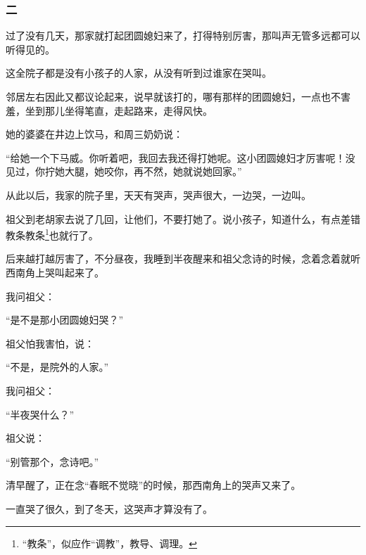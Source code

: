 \subsubsection*{二}
\par 过了没有几天，那家就打起团圆媳妇来了，打得特别厉害，那叫声无管多远都可以听得见的。
\par 这全院子都是没有小孩子的人家，从没有听到过谁家在哭叫。
\par 邻居左右因此又都议论起来，说早就该打的，哪有那样的团圆媳妇，一点也不害羞，坐到那儿坐得笔直，走起路来，走得风快。
\par 她的婆婆在井边上饮马，和周三奶奶说：
\par “给她一个下马威。你听着吧，我回去我还得打她呢。这小团圆媳妇才厉害呢！没见过，你拧她大腿，她咬你，再不然，她就说她回家。”
\par 从此以后，我家的院子里，天天有哭声，哭声很大，一边哭，一边叫。
\par 祖父到老胡家去说了几回，让他们，不要打她了。说小孩子，知道什么，有点差错教条教条\footnote{“教条”，似应作“调教”，教导、调理。}也就行了。
\par 后来越打越厉害了，不分昼夜，我睡到半夜醒来和祖父念诗的时候，念着念着就听西南角上哭叫起来了。
\par 我问祖父：
\par “是不是那小团圆媳妇哭？”
\par 祖父怕我害怕，说：
\par “不是，是院外的人家。”
\par 我问祖父：
\par “半夜哭什么？”
\par 祖父说：
\par “别管那个，念诗吧。”
\par 清早醒了，正在念“春眠不觉晓”的时候，那西南角上的哭声又来了。
\par 一直哭了很久，到了冬天，这哭声才算没有了。
